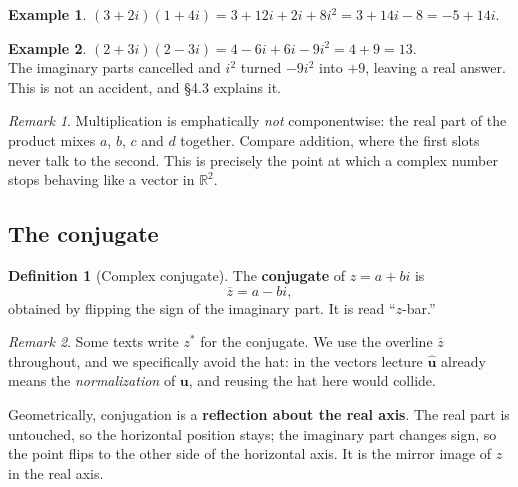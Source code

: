 \documentclass[11pt]{article}
\theoremstyle{definition}
\newtheorem{defn}{Definition}
\newtheorem{ex}{Example}
\theoremstyle{remark}
\newtheorem*{rmk}{Remark}
\newcommand{\R}{\mathbb{R}}
\newcommand{\vc}[1]{\mathbf{#1}}
\newcommand{\conj}[1]{\overline{#1}}
\newcommand{\Rez}{\operatorname{Re}}
\newcommand{\Imz}{\operatorname{Im}}
\newcommand{\cplane}[4]{%
  \draw[step=1cm,gray!25,very thin] (#1,#3) grid (#2,#4);
  \draw[axisline] (#1,0) -- (#2+0.55,0)
        node[right,font=\scriptsize,black]{$\Rez$};
  \draw[axisline] (0,#3) -- (0,#4+0.55)
        node[above,font=\scriptsize,black]{$\Imz$};
}
\newcommand{\cpoint}[5]{%
  \fill[#3] (#1,#2) circle (2.1pt);
  \node[#5,font=\scriptsize,#3] at (#1,#2) {#4};
}
\begin{document}
\begin{ex}
$(3+2i)(1+4i) = 3 + 12i + 2i + 8i^{2} = 3 + 14i - 8 = -5 + 14i$.
\end{ex}

\begin{ex}
$(2+3i)(2-3i) = 4 - 6i + 6i - 9i^{2} = 4 + 9 = 13$. \\
The imaginary parts cancelled and $i^{2}$ turned $-9i^{2}$ into $+9$, leaving a
real answer. This is not an accident, and \S4.3 explains it.
\end{ex}

\begin{rmk}
Multiplication is emphatically \emph{not} componentwise: the real part of the
product mixes $a$, $b$, $c$ and $d$ together. Compare addition, where the first
slots never talk to the second. This is precisely the point at which a complex
number stops behaving like a vector in $\R^{2}$.
\end{rmk}

\subsection{The conjugate}
\begin{defn}[Complex conjugate]
The \textbf{conjugate} of $z=a+bi$ is
\[
  \conj{z} = a-bi ,
\]
obtained by flipping the sign of the imaginary part. It is read ``$z$-bar.''
\end{defn}

\begin{rmk}
Some texts write $z^{*}$ for the conjugate. We use the overline
$\conj{z}$ throughout, and we specifically avoid the hat: in the vectors lecture
$\hat{\vc{u}}$ already means the \emph{normalization} of $\vc{u}$, and reusing
the hat here would collide.
\end{rmk}

\noindent Geometrically, conjugation is a \textbf{reflection about the real
axis}. The real part is untouched, so the horizontal position stays; the
imaginary part changes sign, so the point flips to the other side of the
horizontal axis. It is the mirror image of $z$ in the real axis.

\begin{center}
\end{center}
\end{document}
